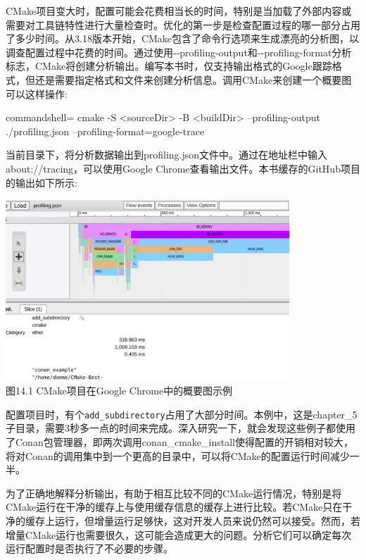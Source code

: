 CMake项目变大时，配置可能会花费相当长的时间，特别是当加载了外部内容或需要对工具链特性进行大量检查时。优化的第一步是检查配置过程的哪一部分占用了多少时间。从3.18版本开始，CMake包含了命令行选项来生成漂亮的分析图，以调查配置过程中花费的时间。通过使用-{}-profiling-output和-{}-profiling-format分析标志，CMake将创建分析输出。编写本书时，仅支持输出格式的Google跟踪格式，但还是需要指定格式和文件来创建分析信息。调用CMake来创建一个概要图可以这样操作:

\begin{tcblisting}{commandshell={}}
cmake -S <sourceDir> -B <buildDir> --profiling-output
  ./profiling.json --profiling-format=google-trace
\end{tcblisting}

当前目录下，将分析数据输出到profiling.json文件中。通过在地址栏中输入about://tracing，可以使用Google Chrome查看输出文件。本书缓存的GitHub项目的输出如下所示:

\begin{center}
\includegraphics[width=0.8\textwidth]{content/3/chapter14/images/1.jpg}\\
图14.1  CMake项目在Google Chrome中的概要图示例
\end{center}

配置项目时，有个\texttt{add\_subdirectory}占用了大部分时间。本例中，这是chapter\_5子目录，需要3秒多一点的时间来完成。深入研究一下，就会发现这些例子都使用了Conan包管理器，即两次调用conan\_cmake\_install使得配置的开销相对较大，将对Conan的调用集中到一个更高的目录中，可以将CMake的配置运行时间减少一半。

为了正确地解释分析输出，有助于相互比较不同的CMake运行情况，特别是将CMake运行在干净的缓存上与使用缓存信息的缓存上进行比较。若CMake只在干净的缓存上运行，但增量运行足够快，这对开发人员来说仍然可以接受。然而，若增量CMake运行也需要很久，这可能会造成更大的问题。分析它们可以确定每次运行配置时是否执行了不必要的步骤。

